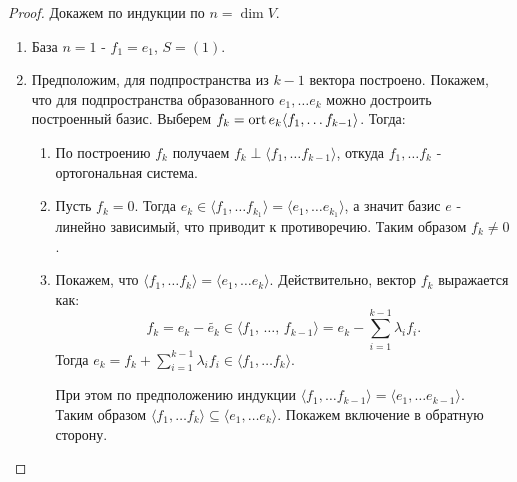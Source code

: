 \begin{proof}
    Докажем по индукции по $n = \dim V$.
    \begin{enumerate}
        \item База $n = 1$ - $f_1 = e_1$, $S = (1)$.
        \item Предположим, для подпространства из $k-1$ вектора построено. Покажем, что для подпространства 
        образованного $e_1, \dots e_k$ можно достроить построенный базис. Выберем 
        $f_k = \operatorname{ort} e_k \langle f_1, \dots f_{k-1} \rangle$. Тогда:
        \begin{enumerate}
            \item По построению $f_k$ получаем $f_k \perp \langle f_1, \dots f_{k-1} \rangle$, 
            откуда $f_1, \dots f_k$ - ортогональная система.
            \item Пусть $f_k = 0$. Тогда $e_k \in \langle f_1, \dots f_{k_1} \rangle = \langle e_1, \dots e_{k_1} \rangle$, 
            а значит базис $e$ - линейно зависимый, что приводит к противоречию. Таким образом $f_k \neq 0$.
            \item Покажем, что $\langle f_1, \dots f_{k} \rangle = \langle e_1, \dots e_{k} \rangle$.
            Действительно, вектор $f_k$ выражается как: 
            $$f_k = e_k - \tilde{e_k} \in \langle f_1, \, \dots ,\, f_{k-1}\rangle 
            = e_k - \displaystyle\sum_{i=1}^{k-1} \lambda_i f_i.$$ 
            Тогда $e_k = f_k + \displaystyle\sum_{i=1}^{k-1} \lambda_i f_i \in \langle f_1, \dots f_{k} \rangle$.
            
            При этом по предположению индукции $\langle f_1, \dots f_{k-1} \rangle = 
            \langle e_1, \dots e_{k-1} \rangle$. \\ Таким образом 
            $\langle f_1, \dots f_{k} \rangle \subseteq 
            \langle e_1, \dots e_{k} \rangle$. Покажем включение в обратную сторону.


\end{enumerate}
\end{enumerate}
\end{proof}

